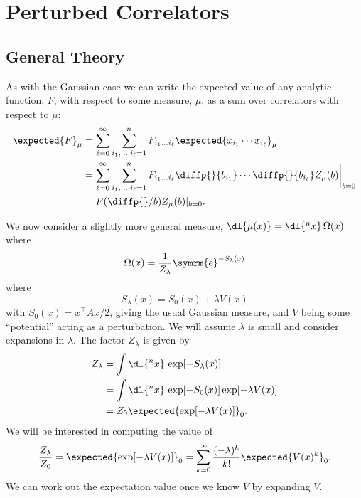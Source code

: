 \documentclass[fleqn]{NotesClass}
\newcommand{\e}{\symrm{e}}
\newcommand{\trans}{{\top}}
\begin{document}
    \chapter{Perturbed Correlators}
    \section{General Theory}
    As with the Gaussian case we can write the expected value of any analytic function, \(F\), with respect to some measure, \(\mu\), as a sum over correlators with respect to \(\mu\):
    \begin{align}
        \expected{F}_\mu &= \sum_{\ell = 0}^{\infty} \sum_{i_1, \dotsc, i_\ell = 1}^{n} F_{i_1\dotso i_{\ell}} \expected{x_{i_1} \dotsm x_{i_\ell}}_\mu\\
        &= \sum_{\ell = 0}^{\infty} \sum_{i_1, \dotsc, i_{\ell} = 1}^{n} F_{i_1\dotso i_\ell} \diffp{}{b_{i_1}} \dotsm \diffp{}{b_{i_\ell}} Z_\mu(b) \bigg|_{b = 0}\\
        &= F(\diffp{}/{b}) Z_\mu(b)|_{b = 0}.
    \end{align}
    
    We now consider a slightly more general measure, \(\dl{\mu(x)} = \dl{^nx} \,\Omega(x)\) where
    \begin{equation}
        \Omega(x) = \frac{1}{Z_\lambda} \e^{-S_\lambda(x)}
    \end{equation}
    where
    \begin{equation}
        S_\lambda(x) = S_0(x) + \lambda V(x)
    \end{equation}
    with \(S_0(x) = x^\trans Ax/2\), giving the usual Gaussian measure, and \(V\) being some \enquote{potential} acting as a perturbation.
    We will assume \(\lambda\) is small and consider expansions in \(\lambda\).
    The factor \(Z_\lambda\) is given by
    \begin{align}
        Z_\lambda &= \int \dl{^nx}  \, \exp[-S_\lambda(x)]\\
        &= \int \dl{^nx} \, \exp[-S_0(x)]\exp[-\lambda V(x)]\\
        &= Z_0 \expected{\exp[-\lambda V(x)]}_0.
    \end{align}
    We will be interested in computing the value of
    \begin{equation}
        \frac{Z_\lambda}{Z_0} = \expected{\exp[-\lambda V(x)]}_0 = \sum_{k = 0}^{\infty} \frac{(-\lambda)^k}{k!} \expected{V(x)^k}_0.
    \end{equation}
    We can work out the expectation value once we know \(V\) by expanding \(V\).
    
\end{document}
